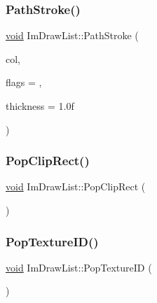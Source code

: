 \mbox{\label{structImDrawList_a60bf9040ef3d09b39c4ba8f5a2a68ae9}} 
\subsubsection{\texorpdfstring{Path\+Stroke()}{PathStroke()}}
{\footnotesize\ttfamily \hyperlink{imgui__impl__opengl3__loader_8h_ac668e7cffd9e2e9cfee428b9b2f34fa7}{void} Im\+Draw\+List\+::\+Path\+Stroke (\begin{DoxyParamCaption}\item[{Im\+U32}]{col,  }\item[{Im\+Draw\+Flags}]{flags = {},  }\item[{float}]{thickness = {\ttfamily 1.0f} }\end{DoxyParamCaption})\hspace{0.3cm}{\ttfamily [inline]}}

\mbox{\label{structImDrawList_a44f40c59ca755f559020f5a7fa81103a}} 
\subsubsection{\texorpdfstring{Pop\+Clip\+Rect()}{PopClipRect()}}
{\footnotesize\ttfamily \hyperlink{imgui__impl__opengl3__loader_8h_ac668e7cffd9e2e9cfee428b9b2f34fa7}{void} Im\+Draw\+List\+::\+Pop\+Clip\+Rect (\begin{DoxyParamCaption}{ }\end{DoxyParamCaption})}

\mbox{\label{structImDrawList_ade9286c5ca58753f7bd571b30e2ff76c}} 
\subsubsection{\texorpdfstring{Pop\+Texture\+I\+D()}{PopTextureID()}}
{\footnotesize\ttfamily \hyperlink{imgui__impl__opengl3__loader_8h_ac668e7cffd9e2e9cfee428b9b2f34fa7}{void} Im\+Draw\+List\+::\+Pop\+Texture\+ID (\begin{DoxyParamCaption}{ }\end{DoxyParamCaption})}


